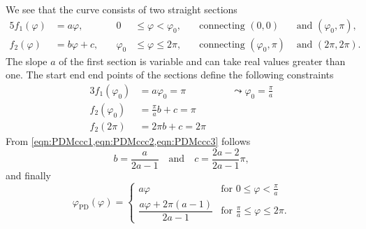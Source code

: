 \documentclass[a4paper]{article}
\begin{document}
\noindent
We see that the curve consists of two straight sections
\begin{alignat}{5}
  f_1(\varphi) &= a\varphi, 
  & \quad 0&\leq\varphi <\varphi_0, 
  & \quad\text{connecting } (0,0) &\text{ and } (\varphi_0,\pi),
\\
  f_2(\varphi) &= b\varphi+c, 
  & \quad \varphi_0&\leq\varphi \leq 2\pi, 
  & \quad\text{connecting } (\varphi_0,\pi) &\text{ and } (2\pi,2\pi).
\end{alignat}
The slope $a$ of the first section is variable and can take real values greater
than one. The start end end points of the sections define the following
constraints
\begin{alignat}{3}
  \label{eqn:PDMccc1}
  f_1(\varphi_0) &= a\varphi_0 = \pi
  && \quad\leadsto \varphi_0 = \frac{\pi}{a}
\\
  \label{eqn:PDMccc2}
  f_2(\varphi_0) &= \frac{\pi}{a}b + c = \pi
\\
  \label{eqn:PDMccc3}
  f_2(2\pi) &= 2\pi b + c = 2\pi
\end{alignat}
From \cref{eqn:PDMccc1,eqn:PDMccc2,eqn:PDMccc3} follows
\begin{equation}
  b = \frac{a}{2a-1}
  \quad\text{and}\quad
  c = \frac{2a-2}{2a-1}\pi,
\end{equation}
and finally
\begin{equation}
  \varphi_{\text{PD}}(\varphi)
  = \begin{cases}
      a\varphi
      & \text{for }0\leq\varphi < \frac{\pi}{a}
    \\[6pt]
      \dfrac{a\varphi+2\pi(a-1)}{2a-1}
      & \text{for }\frac{\pi}{a}\leq\varphi \leq 2\pi. 
    \end{cases}
\end{equation}
\end{document}
